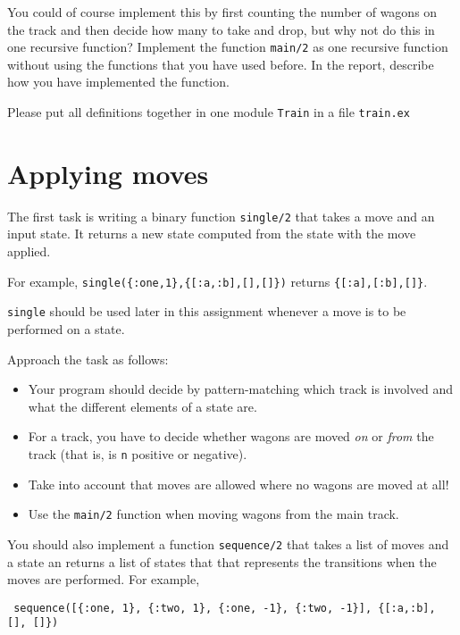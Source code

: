 \documentclass[a4paper,11pt]{article}
\begin{document}
You could of course implement this by first counting the number of
wagons on the track and then decide how many to take and drop, but why
not do this in one recursive function? Implement the function
\verb+main/2+ as one recursive function without using the functions
that you have used before. In the report, describe how you have
implemented the function.

Please put all definitions together in one module {\tt Train} in a
file \verb+train.ex+


\section*{Applying moves}

The first task is writing a binary function \verb+single/2+ that
takes a move and an input state. It returns a
new state computed from the state with the move applied.

For example, \verb+single({:one,1},{[:a,:b],[],[]})+ returns
\verb+{[:a],[:b],[]}+.

\verb+single+ should be used later in this assignment whenever a
move is to be performed on a state.

Approach the task as follows:
\begin{itemize}
  
\item Your program should decide by pattern-matching which track
  is involved and what the different elements of a state are.
  
\item For a track, you have to decide whether wagons are moved
  \emph{on} or \emph{from} the track (that is, is \verb+n+  positive
  or negative).
  
\item Take into account that moves are allowed where no wagons
  are moved at all!

\item Use the \verb+main/2+ function when moving wagons from the main
  track.
\end{itemize}


You should also implement a function {\tt sequence/2}
that takes a list of moves and a state an returns a list of states
that that represents the transitions when the moves are performed.
For example,

\begin{verbatim}
 sequence([{:one, 1}, {:two, 1}, {:one, -1}, {:two, -1}], {[:a,:b], [], []})
\end{verbatim}
\end{document}
